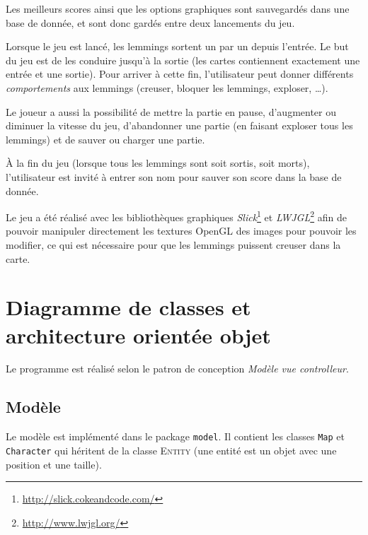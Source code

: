 \documentclass[a4paper,12pt]{article}
\begin{document}
Les meilleurs scores ainsi que les options graphiques sont sauvegardés
dans une base de donnée, et sont donc gardés entre deux lancements du
jeu.

Lorsque le jeu est lancé, les lemmings sortent un par un depuis
l'entrée. Le but du jeu est de les conduire jusqu'à la sortie (les
cartes contiennent exactement une entrée et une sortie). Pour arriver
à cette fin, l'utilisateur peut donner différents \emph{comportements}
aux lemmings (creuser, bloquer les lemmings, exploser, \dots).

Le joueur a aussi la possibilité de mettre la partie en pause,
d'augmenter ou diminuer la vitesse du jeu, d'abandonner une partie (en
faisant exploser tous les lemmings) et de sauver ou charger une
partie.

À la fin du jeu (lorsque tous les lemmings sont soit sortis, soit
morts), l'utilisateur est invité à entrer son nom pour sauver son
score dans la base de donnée.

Le jeu a été réalisé avec les bibliothèques graphiques
\emph{Slick}\footnote{\url{http://slick.cokeandcode.com/}} et
\emph{LWJGL}\footnote{\url{http://www.lwjgl.org/}} afin de pouvoir
manipuler directement les textures OpenGL des images pour pouvoir les
modifier, ce qui est nécessaire pour que les lemmings puissent creuser
dans la carte.

\section{Diagramme de classes et architecture orientée objet}

Le programme est réalisé selon le patron de conception
\emph{Modèle vue controlleur}.

\subsection{Modèle}

Le modèle est implémenté dans le package \texttt{model}. Il
contient les classes \texttt{Map} et \texttt{Character} qui
héritent de la classe \textsc{Entity} (une entité est un
objet avec une position et une taille).
\end{document}
